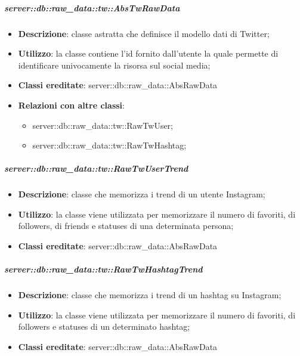 		
		\subparagraph{server::db::raw\_data::tw::AbsTwRawData} %
		\label{subp:server_db_raw_data_tw_abstwrawdata}
			\begin{itemize}
				\item \textbf{Descrizione}: classe astratta che definisce il modello dati di Twitter;
				\item \textbf{Utilizzo}: la classe contiene l'id fornito dall'utente la quale permette di identificare univocamente la risorsa sul social media;
				\item \textbf{Classi ereditate}: server::db::raw\_data::AbsRawData
				\item \textbf{Relazioni con altre classi}:
					\begin{itemize}
						\item server::db::raw\_data::tw::RawTwUser;
						\item server::db::raw\_data::tw::RawTwHashtag;
					\end{itemize}
			\end{itemize}


		\subparagraph{server::db::raw\_data::tw::RawTwUserTrend} %
		\label{subp:server_db_raw_data_tw_rawigusertrend}
			\begin{itemize}
				\item \textbf{Descrizione}: classe che memorizza i trend di un utente Instagram;
				\item \textbf{Utilizzo}: la classe viene utilizzata per memorizzare il numero di favoriti, di followers, di friends e statuses di una determinata persona;
				\item \textbf{Classi ereditate}: server::db::raw\_data::AbsRawData
			\end{itemize}


		\subparagraph{server::db::raw\_data::tw::RawTwHashtagTrend} %
		\label{subp:server_db_raw_data_tw_rawighashtagtrend}
			\begin{itemize}
				\item \textbf{Descrizione}: classe che memorizza i trend di un hashtag su Instagram;
				\item \textbf{Utilizzo}: la classe viene utilizzata per memorizzare il numero di favoriti, di followers e statuses di un determinato hashtag;
				\item \textbf{Classi ereditate}: server::db::raw\_data::AbsRawData
			\end{itemize}


